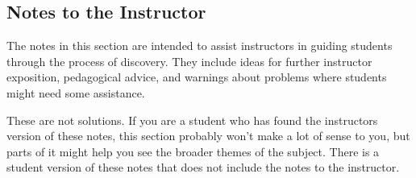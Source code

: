 \begin{annotation}
 \chapter{Notes to the Instructor}

 The notes in this section are intended to assist instructors in guiding students through the process of discovery. They include ideas for further instructor exposition, pedagogical advice, and warnings about problems where students might need some assistance.

 These are not solutions. If you are a student who has found the instructors version of these notes, this section probably won't make a lot of sense to you, but parts of it might help you see the broader themes of the subject. There is a student version of these notes that does not include the notes to the instructor.

 \renewcommand\notesname{}
 \vspace{-2cm}
 \begingroup
 \setlength{\parskip}{2ex}
 \def\enotesize{\large} %
 \theendnotes
 \endgroup
\end{annotation}

\vspace{.1in}


